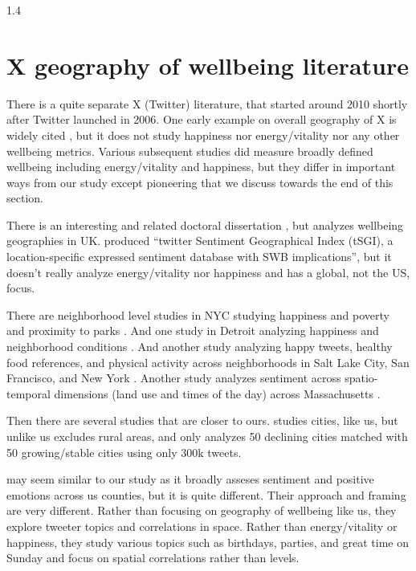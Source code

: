 \documentclass[10pt, letterpaper]{article}
\begin{document}
\begin{spacing}{1.4}
\section{X geography of wellbeing literature}


There is a quite separate X (Twitter) literature, that started around 2010
shortly after Twitter launched in 2006. One
early example on overall geography of X is widely cited \citet{leetaru2013mapping}, but it
does not study happiness nor energy/vitality nor any other wellbeing metrics.  
Various subsequent studies did measure  broadly defined wellbeing including
energy/vitality and happiness, but they differ in important ways from our
study except pioneering  \citet{mitchell13} that we discuss  towards the end of this section.

There is an interesting and related doctoral dissertation
\citep{gupta2018exploring}, but analyzes wellbeing geographies in UK. 
\citet{chai2023twitter} produced ``twitter Sentiment Geographical Index (tSGI), a location-specific expressed sentiment database with SWB implications'', but it doesn't really
analyze energy/vitality nor happiness and has a global, not the US, focus.

There are neighborhood level studies in NYC studying happiness and poverty
\citep{tan2021people}  and proximity to parks  \citep{plunz2019twitter}. And one
study in Detroit 
 analyzing happiness and neighborhood conditions \citep{park2021happy}. And
 another study analyzing happy tweets, healthy food references, and physical activity
 across neighborhoods in Salt Lake City, San Francisco, and New York \citep{nguyen2016leveraging}. 
 Another study analyzes sentiment across spatio-temporal dimensions (land
 use and times of the day) across Massachusetts \citep{cao2018using}.

Then there are several studies that are closer to ours. 
\citet{hollander2022measuring} studies cities, like us, but unlike us excludes rural areas, and only analyzes 50 declining cities matched with 50 growing/stable
cities using only 300k tweets.

 \citet{hu2019systematic} may seem similar to our study as it
broadly asseses sentiment and positive emotions across us counties, but it is quite 
different.
%
Their approach
and framing are very different. Rather than focusing on 
 geography of wellbeing like us, they explore tweeter topics and correlations in
 space.
%
 Rather than energy/vitality or happiness, they study various topics
 such as birthdays, parties, and great time on Sunday and focus on spatial
 correlations rather than levels. 
 

\end{spacing}
\end{document}
